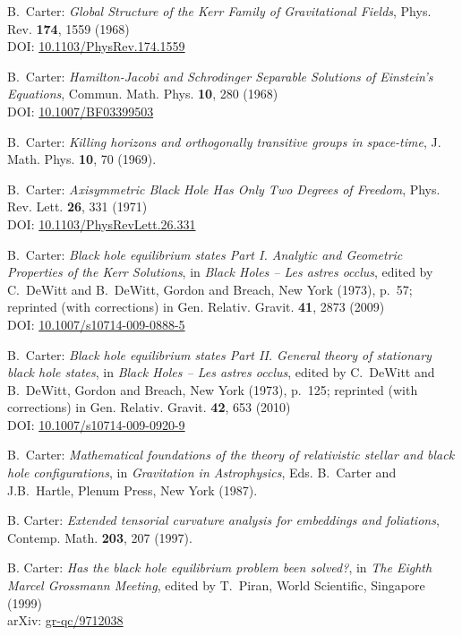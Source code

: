 \begin{thebibliography}{123}
B.~Carter:
{\em Global Structure of the Kerr Family of Gravitational Fields},
Phys. Rev. {\bf 174}, 1559 (1968)\\
DOI: \href{https://doi.org/10.1103/PhysRev.174.1559}{10.1103/PhysRev.174.1559}

B.~Carter:
{\em Hamilton-Jacobi and Schrodinger Separable Solutions of Einstein's Equations},
Commun. Math. Phys. {\bf 10}, 280 (1968)\\
DOI: \href{https://doi.org/10.1007/BF03399503}{10.1007/BF03399503}

B.~Carter: {\em Killing horizons and orthogonally transitive groups
in space-time},
J. Math. Phys. {\bf 10}, 70 (1969).

B.~Carter: {\em Axisymmetric Black Hole Has Only Two Degrees of Freedom},
Phys. Rev. Lett. {\bf 26}, 331 (1971)\\
DOI: \href{https://doi.org/10.1103/PhysRevLett.26.331}{10.1103/PhysRevLett.26.331}

B.~Carter: {\em Black hole equilibrium states Part I.
Analytic and Geometric Properties of the Kerr Solutions},
in {\em Black Holes -- Les astres occlus},  edited by C.~DeWitt and B.~DeWitt,
Gordon and Breach, New York (1973), p.~57; reprinted (with corrections) in
Gen. Relativ. Gravit. {\bf 41}, 2873 (2009)\\
DOI: \href{https://doi.org/10.1007/s10714-009-0888-5}{10.1007/s10714-009-0888-5}

B.~Carter: {\em Black hole equilibrium states Part II. General theory of stationary black hole states}, in {\em Black Holes -- Les astres occlus},  edited by C.~DeWitt and B.~DeWitt,
Gordon and Breach, New York (1973), p.~125; reprinted (with corrections) in
Gen. Relativ. Gravit. {\bf 42}, 653 (2010)\\
DOI: \href{https://doi.org/10.1007/s10714-009-0920-9}{10.1007/s10714-009-0920-9}

B.~Carter: {\em Mathematical foundations of the theory of
relativistic stellar and black hole configurations},
in {\em Gravitation in Astrophysics}, Eds. B.~Carter and J.B.~Hartle,
Plenum Press, New York (1987).

B. Carter: {\em Extended tensorial curvature analysis for embeddings
and foliations},
Contemp. Math. {\bf 203}, 207 (1997).

B. Carter: {\em Has the black hole equilibrium problem been solved?},
in {\em The Eighth Marcel Grossmann Meeting}, edited by T.~Piran,
World Scientific, Singapore (1999)\\
arXiv: \href{https://arxiv.org/abs/gr-qc/9712038}{gr-qc/9712038}


\end{thebibliography}
